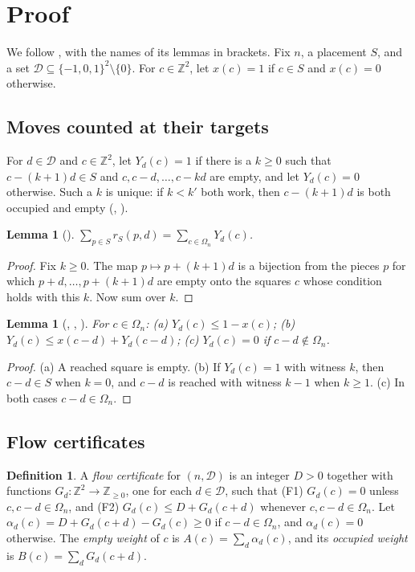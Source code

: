 \documentclass[11pt]{amsart}
\theoremstyle{plain}
\newtheorem{lemma}[theorem]{Lemma}
\theoremstyle{definition}
\newtheorem{definition}[theorem]{Definition}
\newcommand{\Z}{\mathbb{Z}}
\begin{document}
\section{Proof}\label{sec:proof}

We follow , with the names of its lemmas in brackets. Fix $n$, a placement $S$, and a set $\mathcal D\subseteq\{-1,0,1\}^2\setminus\{0\}$. For $c\in\Z^2$, let $x(c)=1$ if $c\in S$ and $x(c)=0$ otherwise.

\subsection{Moves counted at their targets}
For $d\in\mathcal D$ and $c\in\Z^2$, let $Y_d(c)=1$ if there is a $k\ge0$ such that $c-(k+1)d\in S$ and $c,c-d,\dots,c-kd$ are empty, and let $Y_d(c)=0$ otherwise. Such a $k$ is unique: if $k<k'$ both work, then $c-(k+1)d$ is both occupied and empty (, ).

\begin{lemma}[]\label{lem:target}
$\sum_{p\in S}r_S(p,d)=\sum_{c\in\Omega_n}Y_d(c)$.
\end{lemma}
\begin{proof}
Fix $k\ge0$. The map $p\mapsto p+(k+1)d$ is a bijection from the pieces $p$ for which $p+d,\dots,p+(k+1)d$ are empty onto the squares $c$ whose condition holds with this $k$. Now sum over $k$.
\end{proof}

\begin{lemma}[, , ]\label{lem:Y}
For $c\in\Omega_n$:
\textup{(a)} $Y_d(c)\le1-x(c)$;
\textup{(b)} $Y_d(c)\le x(c-d)+Y_d(c-d)$;
\textup{(c)} $Y_d(c)=0$ if $c-d\notin\Omega_n$.
\end{lemma}
\begin{proof}
(a) A reached square is empty. (b) If $Y_d(c)=1$ with witness $k$, then $c-d\in S$ when $k=0$, and $c-d$ is reached with witness $k-1$ when $k\ge1$. (c) In both cases $c-d\in\Omega_n$.
\end{proof}

\subsection{Flow certificates}

\begin{definition}\label{def:cert}
A \emph{flow certificate} for $(n,\mathcal D)$ is an integer $D>0$ together with functions $G_d\colon\Z^2\to\Z_{\ge0}$, one for each $d\in\mathcal D$, such that
(F1) $G_d(c)=0$ unless $c,c-d\in\Omega_n$, and
(F2) $G_d(c)\le D+G_d(c+d)$ whenever $c,c-d\in\Omega_n$.
Let $\alpha_d(c)=D+G_d(c+d)-G_d(c)\ge0$ if $c-d\in\Omega_n$, and $\alpha_d(c)=0$ otherwise. The \emph{empty weight} of $c$ is $A(c)=\sum_{d}\alpha_d(c)$, and its \emph{occupied weight} is $B(c)=\sum_dG_d(c+d)$.
\end{definition}
\end{document}
